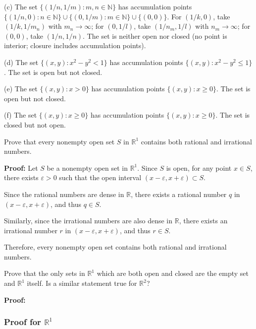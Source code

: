 (c) The set $\{(1/n, 1/m) : m,n \in \mathbb{N}\}$ has accumulation points $\{(1/n, 0) : n \in \mathbb{N}\} \cup \{(0, 1/m) : m \in \mathbb{N}\} \cup \{(0, 0)\}$. For $(1/k, 0)$, take $(1/k, 1/m_n)$ with $m_n \to \infty$; for $(0, 1/l)$, take $(1/n_m, 1/l)$ with $n_m \to \infty$; for $(0, 0)$, take $(1/n, 1/n)$. The set is neither open nor closed (no point is interior; closure includes accumulation points).

(d) The set $\{(x,y) : x^2 - y^2 < 1\}$ has accumulation points $\{(x,y) : x^2 - y^2 \leq 1\}$. The set is open but not closed.

(e) The set $\{(x,y) : x > 0\}$ has accumulation points $\{(x,y) : x \geq 0\}$. The set is open but not closed.

(f) The set $\{(x,y) : x \geq 0\}$ has accumulation points $\{(x,y) : x \geq 0\}$. The set is closed but not open.

\begin{problembox}
Prove that every nonempty open set $S$ in $\mathbb{R}^1$ contains both rational and irrational numbers.
\end{problembox}

\textbf{Proof:} Let $S$ be a nonempty open set in $\mathbb{R}^1$. Since $S$ is open, for any point $x \in S$, there exists $\varepsilon > 0$ such that the open interval $(x-\varepsilon, x+\varepsilon) \subset S$.

Since the rational numbers are dense in $\mathbb{R}$, there exists a rational number $q$ in $(x-\varepsilon, x+\varepsilon)$, and thus $q \in S$.

Similarly, since the irrational numbers are also dense in $\mathbb{R}$, there exists an irrational number $r$ in $(x-\varepsilon, x+\varepsilon)$, and thus $r \in S$.

Therefore, every nonempty open set contains both rational and irrational numbers.

\begin{problembox}
Prove that the only sets in $\mathbb{R}^1$ which are both open and closed are the empty set and $\mathbb{R}^1$ itself. Is a similar statement true for $\mathbb{R}^2$?
\end{problembox}

\textbf{Proof:}

\subsubsection*{Proof for $\mathbb{R}^1$}

